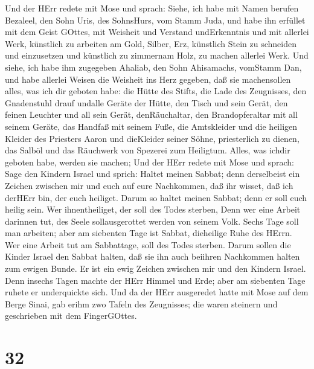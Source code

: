  Und der HErr redete mit Mose und sprach: 
Siehe, ich habe mit Namen berufen Bezaleel, den Sohn Uris, des
SohnsHurs, vom Stamm Juda,  und habe ihn erfüllet mit dem
Geist GOttes, mit Weisheit und Verstand undErkenntnis und mit allerlei
Werk,  künstlich zu arbeiten am Gold, Silber, Erz,
 künstlich Stein zu schneiden und einzusetzen und künstlich
zu zimmernam Holz, zu machen allerlei Werk.  Und siehe, ich
habe ihm zugegeben Ahaliab, den Sohn Ahisamachs, vomStamm Dan, und habe
allerlei Weisen die Weisheit ins Herz gegeben, daß sie machensollen
alles, was ich dir geboten habe:  die Hütte des Stifts, die
Lade des Zeugnisses, den Gnadenstuhl drauf undalle Geräte der Hütte,
 den Tisch und sein Gerät, den feinen Leuchter und all sein
Gerät, denRäuchaltar,  den Brandopferaltar mit all seinem
Geräte, das Handfaß mit seinem Fuße,  die Amtskleider und
die heiligen Kleider des Priesters Aaron und dieKleider seiner Söhne,
priesterlich zu dienen,  das Salböl und das Räuchwerk von
Spezerei zum Heiligtum. Alles, was ichdir geboten habe, werden sie
machen;  Und der HErr redete mit Mose und sprach:
 Sage den Kindern Israel und sprich: Haltet meinen Sabbat;
denn derselbeist ein Zeichen zwischen mir und euch auf eure Nachkommen,
daß ihr wisset, daß ich derHErr bin, der euch heiliget. 
Darum so haltet meinen Sabbat; denn er soll euch heilig sein. Wer
ihnentheiliget, der soll des Todes sterben, Denn wer eine Arbeit
darinnen tut, des Seele sollausgerottet werden von seinem Volk.
 Sechs Tage soll man arbeiten; aber am siebenten Tage ist
Sabbat, dieheilige Ruhe des HErrn. Wer eine Arbeit tut am Sabbattage,
soll des Todes sterben.  Darum sollen die Kinder Israel den
Sabbat halten, daß sie ihn auch beiihren Nachkommen halten zum ewigen
Bunde.  Er ist ein ewig Zeichen zwischen mir und den
Kindern Israel. Denn insechs Tagen machte der HErr Himmel und Erde; aber
am siebenten Tage ruhete er underquickte sich.  Und da der
HErr ausgeredet hatte mit Mose auf dem Berge Sinai, gab erihm zwo Tafeln
des Zeugnisses; die waren steinern und geschrieben mit dem FingerGOttes.

\hypertarget{section-31}{%
\section{32}\label{section-31}}

